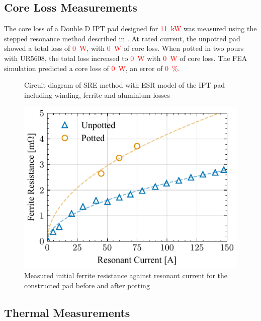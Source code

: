 \documentclass[conference]{IEEEtran}
\begin{document}
\subsection{Core Loss Measurements}

The core loss of a Double D IPT pad designed for \textcolor{red}{\SI{11}{\kilo\watt}} was measured using the stepped resonance method described in \cite{kalraPowerLossMeasurement2020}.
At rated current, the unpotted pad showed a total loss of \textcolor{red}{\SI{0}{\watt}}, with \textcolor{red}{\SI{0}{\watt}} of core loss.
When potted in two pours with UR5608, the total loss increased to \textcolor{red}{\SI{0}{\watt}} with \textcolor{red}{\SI{0}{\watt}} of core loss. 
The FEA simulation predicted a core loss of \textcolor{red}{\SI{0}{\watt}}, an error of \textcolor{red}{\SI{0}{\percent}}. 

\lipsum[1]

\begin{figure}[t]
  
  \caption{Circuit diagram of SRE method with ESR model of the IPT pad including winding, ferrite and aluminium losses}
  \label{fig:sremethodcircuitdiagram}
\end{figure}

\begin{figure}[t]
  \includegraphics{figures/24-10-17_initialFerriteResistanceComparisonV2.pdf}
  \caption{Measured initial ferrite resistance against resonant current for the constructed pad before and after potting}
  \label{fig:initialFerriteResistanceComparison}
\end{figure}

\subsection{Thermal Measurements}
\end{document}
